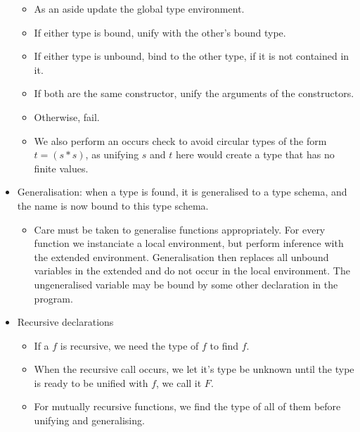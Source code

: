 \begin{itemize}
\begin{itemize}
\item As an aside update the global type environment.

\item If either type is bound, unify with the other's bound type.

\item If either type is unbound, bind to the other type, if it is not contained
in it.

\item If both are the same constructor, unify the arguments of the
constructors.

\item Otherwise, fail.

\item We also perform an occurs check to avoid circular types of the form
$t=(s*s)$, as unifying $s$ and $t$ here would create a type that has no finite
values.

\end{itemize}

\item Generalisation: when a type is found, it is generalised to a type schema,
and the name is now bound to this type schema.

\begin{itemize}

\item Care must be taken to generalise functions appropriately. For every
function we instanciate a local environment, but perform inference with the
extended environment. Generalisation then replaces all unbound variables in the
extended and do not occur in the local environment. The ungeneralised variable
may be bound by some other declaration in the program.

\end{itemize}

\item Recursive declarations

\begin{itemize}

\item If a $f$ is recursive, we need the type of $f$ to find $f$.

\item When the recursive call occurs, we let it's type be unknown until the
type is ready to be unified with $f$, we call it $F$.

\item For mutually recursive functions, we find the type of all of them before
unifying and generalising.


\end{itemize}
\end{itemize}
